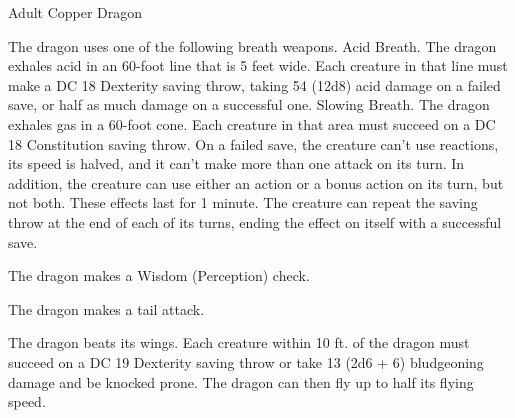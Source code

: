 \begin{monsterbox}{Adult Copper Dragon}
\begin{monsteraction}
The dragon uses one of the following breath weapons.
Acid Breath. The dragon exhales acid in an 60-foot line that is 5 feet wide. Each creature in that line must make a DC 18 Dexterity saving throw, taking 54 (12d8) acid damage on a failed save, or half as much damage on a successful one.
Slowing Breath. The dragon exhales gas in a 60-foot cone. Each creature in that area must succeed on a DC 18 Constitution saving throw. On a failed save, the creature can't use reactions, its speed is halved, and it can't make more than one attack on its turn. In addition, the creature can use either an action or a bonus action on its turn, but not both. These effects last for 1 minute. The creature can repeat the saving throw at the end of each of its turns, ending the effect on itself with a successful save.
\end{monsteraction}
\begin{monsteraction}[Detect]
The dragon makes a Wisdom (Perception) check.
\end{monsteraction}
\begin{monsteraction}
The dragon makes a tail attack.
\end{monsteraction}
\begin{monsteraction}
The dragon beats its wings. Each creature within 10 ft. of the dragon must succeed on a DC 19 Dexterity saving throw or take 13 (2d6 + 6) bludgeoning damage and be knocked prone. The dragon can then fly up to half its flying speed.
\end{monsteraction}
\end{monsterbox}